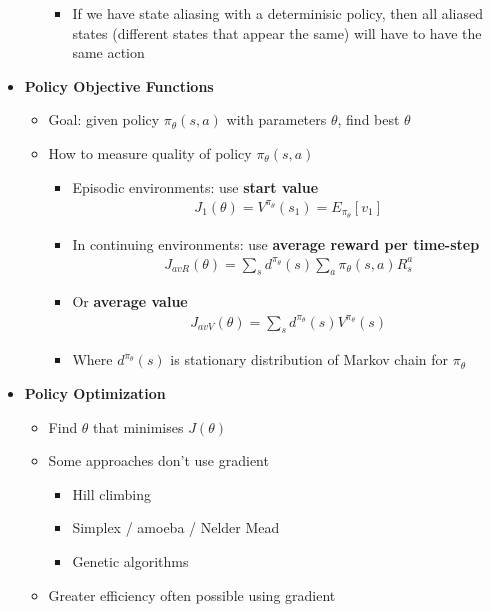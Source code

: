 \documentclass[12pt]{article}
\begin{document}
\begin{itemize}
\begin{itemize}
\begin{itemize}
      \item If we have state aliasing with a determinisic policy, then all aliased states
      (different states that appear the same) will have to have the same action
    \end{itemize}
  \end{itemize}
  \item \textbf{Policy Objective Functions}
  \begin{itemize}
    \item Goal: given policy $\pi_\theta(s,a)$ with parameters $\theta$, find best $\theta$
    \item How to measure quality of policy $\pi_\theta(s,a)$
    \begin{itemize}
      \item Episodic environments: use \textbf{start value}
      \begin{gather*}
        J_1(\theta) = V^{\pi_\theta}(s_1) = E_{\pi_\theta}[v_1]
      \end{gather*}
      \item In continuing environments: use \textbf{average reward per time-step}
      \begin{gather*}
        J_{avR}(\theta) = \sum\limits_s d^{\pi_\theta}(s) \sum\limits_a \pi_\theta(s, a)R_s^a
      \end{gather*}
      \item Or \textbf{average value}
      \begin{gather*}
        J_{avV}(\theta) = \sum\limits_s d^{\pi_\theta}(s)V^{\pi_\theta}(s)
      \end{gather*}
      \item Where $d^{\pi_\theta}(s)$ is stationary distribution of Markov chain for $\pi_\theta$
    \end{itemize}
  \end{itemize}
  \item \textbf{Policy Optimization}
  \begin{itemize}
    \item Find $\theta$ that minimises $J(\theta)$
    \item Some approaches don't use gradient
    \begin{itemize}
      \item Hill climbing
      \item Simplex / amoeba / Nelder Mead
      \item Genetic algorithms
    \end{itemize}
    \item Greater efficiency often possible using gradient

\end{itemize}
\end{itemize}
\end{document}
